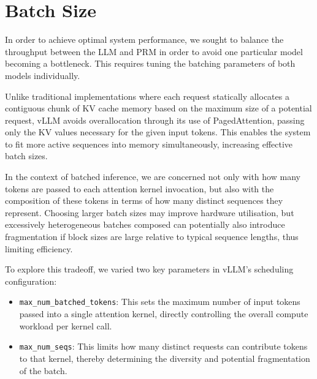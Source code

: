 \documentclass[11pt,twoside]{report}
\begin{document}
\section{Batch Size}

In order to achieve optimal system performance, we sought to balance the throughput between the LLM and PRM in order to avoid one particular model becoming a bottleneck.
This requires tuning the batching parameters of both models individually.

Unlike traditional implementations where each request statically allocates a contiguous chunk of KV cache memory based on the maximum size of a potential request, vLLM avoids overallocation through its use of PagedAttention, passing only the KV values necessary for the given input tokens.
This enables the system to fit more active sequences into memory simultaneously, increasing effective batch sizes.

In the context of batched inference, we are concerned not only with how many tokens are passed to each attention kernel invocation, but also with the composition of these tokens in terms of how many distinct sequences they represent.
Choosing larger batch sizes may improve hardware utilisation, but excessively heterogeneous batches composed can potentially also introduce fragmentation if block sizes are large relative to typical sequence lengths, thus limiting efficiency.

To explore this tradeoff, we varied two key parameters in vLLM’s scheduling configuration:

\begin{itemize}
  \item \texttt{max\_num\_batched\_tokens}: This sets the maximum number of input tokens passed into a single attention kernel, directly controlling the overall compute workload per kernel call.
  \item \texttt{max\_num\_seqs}: This limits how many distinct requests can contribute tokens to that kernel, thereby determining the diversity and potential fragmentation of the batch.
\end{itemize}
\end{document}
